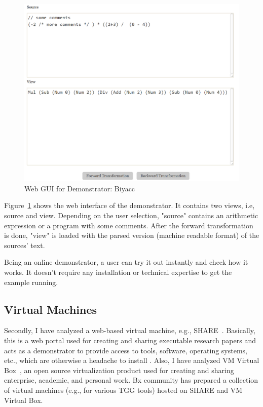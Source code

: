 \begin{figure}
	\includegraphics[width=1\textwidth]{figures/Biyacc}
	\caption{Web GUI for Demonstrator: Biyacc}
	\label{fig:WebGUI_Biyacc}
\end{figure}

Figure~\ref{fig:WebGUI_Biyacc} shows the web interface of the demonstrator. It contains two views, i.e, source and view. Depending on the user selection, "source" contains an arithmetic expression or a program with some comments. After the forward transformation is done, "view" is loaded with the parsed version (machine readable format) of the sources' text.
  
Being an online demonstrator, a user can try it out instantly and check how it works. It doesn't require any installation or technical expertise to get the example running.

\subsection{Virtual Machines}\label{subsec:virtualmachines}
Secondly, I have analyzed a web-based virtual machine, e.g., SHARE~\cite{share}. Basically, this is a web portal used for creating and sharing executable research papers and acts as a demonstrator to provide access to tools, software, operating systems, etc., which are otherwise a headache to install \cite{share}. Also, I have analyzed VM Virtual Box~\cite{virtualbox}, an open source virtualization product used for creating and sharing enterprise, academic, and personal work. Bx community has prepared a collection of virtual machines (e.g., for various TGG tools) hosted on SHARE and VM Virtual Box.

